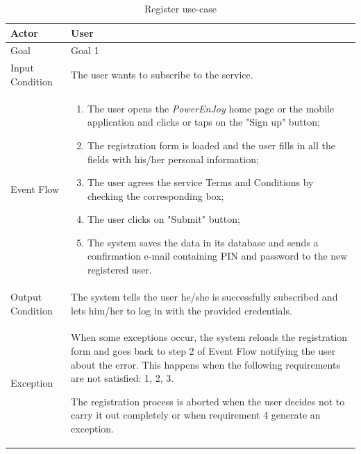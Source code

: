\begin{table}[H]
\begin{center}
\begin{tabular}{p{} | p{}}
\hline
Actor & User\\
\hline
Goal & Goal 1\\
\hline
Input Condition & The user wants to subscribe to the service.\\
\hline
Event Flow & 
\begin{enumerate}
\item The user opens the \emph{PowerEnJoy} home page or the mobile application and clicks or taps on the "Sign up" button;
\item The registration form is loaded and the user fills in all the fields with his/her personal information;
\item The user agrees the service Terms and Conditions by checking the corresponding box;
\item The user clicks on "Submit" button;
\item The system saves the data in its database and sends a confirmation e-mail containing PIN and password to the new registered user.
\end{enumerate} \\
\hline
Output Condition & The system tells the user he/she is successfully subscribed and lets him/her to log in with the provided credentials.\\
\hline
Exception & When some exceptions occur, the system reloads the registration form and goes back to step 2 of Event Flow notifying the user about the error. This happens when the following requirements are not satisfied: 1, 2, 3.

The registration process is aborted when the user decides not to carry it out completely or when requirement 4 generate an exception.\\
\hline
\end{tabular}
\end{center}
\caption{Register use-case}
\label{register_uc}
\end{table}

